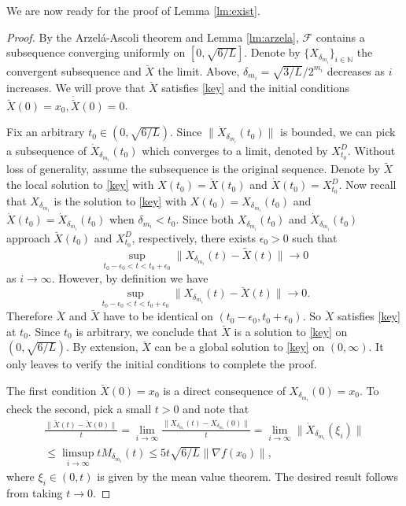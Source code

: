 \documentclass[twoside,11pt]{article}
\newcommand{\der}[1]{\dot #1}
\newcommand{\norm}[1]{\|#1\|}
\begin{document}
We are now ready for the proof of Lemma \ref{lm:exist}.
\begin{proof}
By the Arzel\'a-Ascoli theorem and Lemma \ref{lm:arzela}, $\mathcal{F}$ contains a subsequence converging uniformly on $[0, \sqrt{6/L}]$. Denote by $\{X_{\delta_{m_i}}\}_{i\in\mathbb{N}}$ the convergent subsequence and $\breve X$ the limit. Above, $\delta_{m_i} = \sqrt{3/L}/2^{m_i}$ decreases as $i$ increases. We will prove that $\breve X$ satisfies \eqref{key} and the initial conditions $\breve X(0) = x_0, \dot{\breve{X}}(0) = 0$.

Fix an arbitrary $t_0\in (0, \sqrt{6/L})$. Since
$\norm{\der{X}_{\delta_{m_i}}(t_0)}$ is bounded, we can pick a
subsequence of $\der{X}_{\delta_{m_i}}(t_0)$ which converges to a
limit, denoted by $X^D_{t_0}$. Without loss of generality, assume the
subsequence is the original sequence. Denote by $\tilde X$ the local
solution to \eqref{key} with $X(t_0) = \breve X(t_0)$ and
$\der{X}(t_0) = X^D_{t_0}$. Now recall that ${X}_{\delta_{m_i}}$ is the
solution to \eqref{key} with $X(t_0) = X_{\delta_{m_i}}(t_0)$ and
$\der{X}(t_0) = \der{X}_{\delta_{m_i}}(t_0)$ when $\delta_{m_i} <
t_0$. Since both $X_{\delta_{m_i}}(t_0)$ and
$\der{X}_{\delta_{m_i}}(t_0)$ approach $\breve X(t_0)$ and
$X^D_{t_0}$, respectively, there exists $\epsilon_0>0$ such that
\begin{equation}\nonumber
\sup_{t_0-\epsilon_0 < t < t_0+\epsilon_0}\norm{X_{\delta_{m_i}}(t) - \tilde X(t)}\rightarrow 0
\end{equation}
as $i\rightarrow\infty$. However, by definition we have  
\begin{equation}\nonumber
\sup_{t_0-\epsilon_0 < t <t_0+\epsilon_0}\norm{X_{\delta_{m_i}}(t) - \breve X(t)}\rightarrow 0.
\end{equation}
Therefore $\breve X$ and $\tilde X$ have to be identical on $(t_0-\epsilon_0, t_0+\epsilon_0)$. So $\breve X$ satisfies \eqref{key} at $t_0$. Since $t_0$ is arbitrary, we conclude that $\breve X$ is a solution to \eqref{key} on $(0, \sqrt{6/L})$. By extension, $\breve X$ can be a global solution to \eqref{key} on $(0, \infty)$. It only leaves to verify the initial conditions to complete the proof.

The first condition $\breve X(0)= x_0$ is a direct consequence of $X_{\delta_{m_i}}(0) = x_0$. To check the second, pick a small $t>0$ and note that
\begin{multline}\nonumber
\frac{\norm{\breve X(t) - \breve X(0)}}{t} = \lim_{i\rightarrow\infty}\frac{\norm{X_{\delta_{m_i}}(t) - X_{\delta_{m_i}}(0)}}{t} = \lim_{i\rightarrow\infty}\norm{\der{X}_{\delta_{m_i}}(\xi_i)}\\
 \le \limsup_{i\rightarrow\infty}tM_{\delta_{m_i}}(t) \le 5t\sqrt{6/L}\norm{\nabla f(x_0)},
\end{multline}
where $\xi_i\in(0, t)$ is given by the mean value theorem. The desired result follows from taking $t\rightarrow 0$.
\end{proof}
\end{document}
